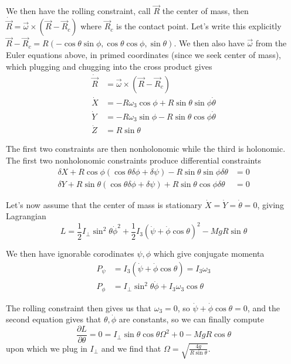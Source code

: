 \documentclass[10pt]{report}
\newcommand{\pd}[2]{\frac{\partial #1}{\partial#2}}
\begin{document}
We then have the rolling constraint, call $\vec{R}$ the center of mass, then $\dot{\vec{R}} = \vec{\omega} \times (\vec{R} - \vec{R}_c)$ where $\vec{R}_c$ is the contact point. Let's write this explicitly $\vec{R} - \vec{R}_c = R\left( -\cos \theta\sin\phi, \cos\theta\cos\phi, \sin \theta \right)$. We then also have $\vec{\omega}$ from the Euler equations above, in primed coordinates (since we seek center of mass), which plugging and chugging into the cross product gives
\begin{align*}
    \dot{ \vec{R}} &= \vec{\omega}\times (\vec{R} - \vec{R}_c)\\
    \dot{X} &= -R\omega_3\cos \phi + R\sin \theta\sin \phi \dot{\theta}\\
    \dot{Y} &= -R\omega_3 \sin \phi - R\sin \theta\cos\phi \dot{\theta}\\
    \dot{Z} &= R\sin \theta
\end{align*}

The first two constraints are then nonholonomic while the third is holonomic. The first two nonholonomic constraints produce differential constraints
\begin{align*}
    \delta X + R\cos \phi\left( \cos\theta \delta \phi + \delta\psi \right) - R\sin \theta\sin \phi\delta\theta &= 0\\
    \delta Y + R\sin\theta \left( \cos \theta\delta\phi + \delta\psi \right) + R\sin \theta\cos \phi \delta\theta &= 0
\end{align*}

Let's now assume that the center of mass is stationary $\dot{X} = \dot{Y} = \dot{\theta} = 0$, giving Lagrangian
$$L = \frac{1}{2}I_\perp \sin^2\theta \dot{\phi}^2 + \frac{1}{2}I_3\left( \dot{\psi} + \dot{\phi}\cos \theta \right)^2 - MgR\sin\theta$$

We then have ignorable corodinates $\psi,\phi$ which give conjugate momenta
\begin{align*}
    P_\psi &= I_3\left( \dot{\psi} + \dot{\phi}\cos\theta \right) = I_3 \omega_3\\
    P_\phi &= I_{\perp}\sin^2\theta\dot{\phi} + I_3\omega_3\cos\theta
\end{align*}

The rolling constraint then gives us that $\omega_3 = 0$, so $\dot{\psi} + \dot{\phi}\cos\theta = 0$, and the second equation gives that $\theta, \dot{\phi}$ are constants, so we can finally compute
$$\pd{L}{\theta} = 0 = I_{\perp}\sin\theta\cos\theta\Omega^2 + 0 - MgR\cos\theta$$
upon which we plug in $I_{\perp}$ and we find that $\Omega = \sqrt{\frac{4g}{R\sin\theta}}$. 
\end{document}
